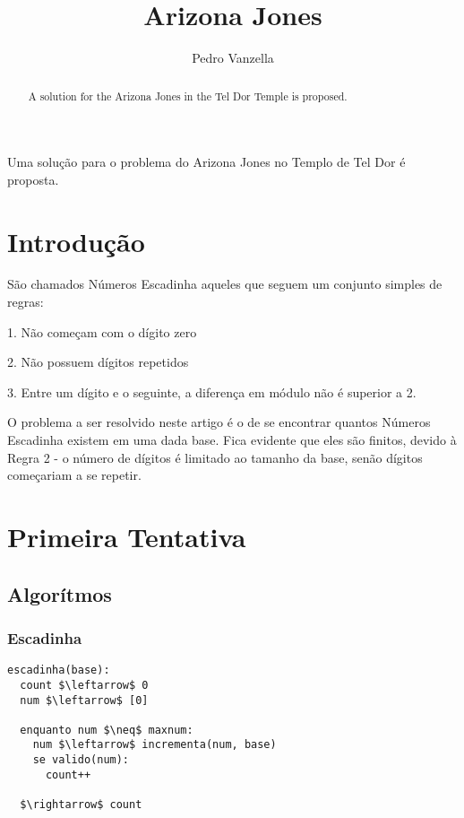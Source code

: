 \documentclass[12pt]{article}
\title{Arizona Jones}
\author{Pedro Vanzella\inst{1}}
\newenvironment{lyxlist}[1]
{\begin{list}{}
{\settowidth{\labelwidth}{#1}
 \setlength{\leftmargin}{\labelwidth}
 \addtolength{\leftmargin}{\labelsep}
 \renewcommand{\makelabel}[1]{##1\hfil}}}
{\end{list}}
\begin{document}
\maketitle
\begin{abstract}
  A solution for the Arizona Jones in the Tel Dor Temple is proposed.
\end{abstract}
\begin{resumo}
  Uma solu\c{c}ão para o problema do Arizona Jones no Templo de Tel Dor é proposta.
\end{resumo}


\section{Introdução}\label{section:intro}

São chamados Números Escadinha aqueles que seguem um conjunto simples
de regras:
\begin{lyxlist}{00.00.0000}
\item [{1.}] Não começam com o dígito zero
\item [{2.}] Não possuem dígitos repetidos
\item [{3.}] Entre um dígito e o seguinte, a diferença em módulo não é
superior a 2.
\end{lyxlist}
O problema a ser resolvido neste artigo é o de se encontrar quantos
Números Escadinha existem em uma dada base. Fica evidente que eles
são finitos, devido à Regra 2 - o número de dígitos é limitado ao
tamanho da base, senão dígitos começariam a se repetir.


\section{Primeira Tentativa}\label{section:primeira}


\subsection{Algorítmos}\label{section:primeira:algoritmos}


\subsubsection{Escadinha}\label{section:primeira:algoritmos:escadinha}

\begin{lstlisting}
escadinha(base):
  count $\leftarrow$ 0
  num $\leftarrow$ [0] 
	
  enquanto num $\neq$ maxnum: 
    num $\leftarrow$ incrementa(num, base) 
    se valido(num):
      count++

  $\rightarrow$ count
\end{lstlisting}
\end{document}
